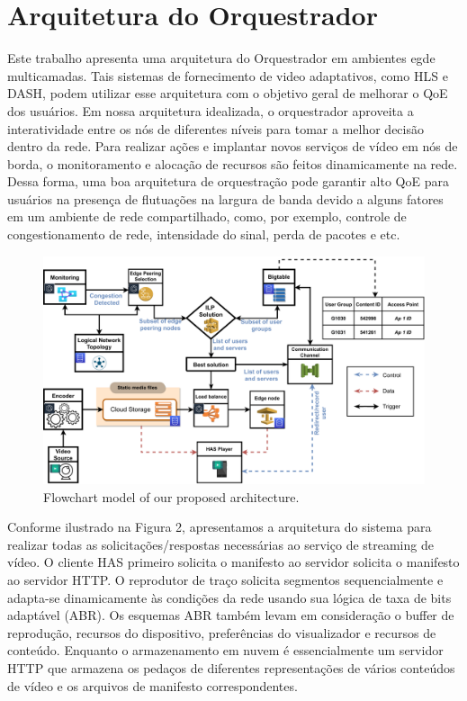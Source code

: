 \section{Arquitetura do Orquestrador}
\label{sec:mechanism}

Este trabalho apresenta uma arquitetura do Orquestrador em ambientes egde multicamadas. Tais sistemas de fornecimento de video adaptativos, como HLS e DASH, podem utilizar esse arquitetura com o objetivo geral de melhorar o QoE dos usuários.
Em nossa arquitetura idealizada, o orquestrador aproveita a interatividade entre os nós de diferentes níveis para tomar a melhor decisão dentro da rede. 
Para realizar ações e implantar novos serviços de vídeo em nós de borda, o monitoramento e alocação de recursos são feitos dinamicamente na rede. Dessa forma, uma boa arquitetura de orquestração pode garantir alto QoE para usuários na presença de flutuações na largura de banda devido a alguns fatores em um ambiente de rede compartilhado, como, por exemplo, controle de congestionamento de rede, intensidade do sinal, perda de pacotes e etc.

\begin{figure}
  \includegraphics[width=\linewidth]{images/flow-model-infrastructure.pdf}
  \caption{Flowchart model of our proposed architecture.}
\end{figure}

Conforme ilustrado na Figura 2, apresentamos a arquitetura do sistema para realizar todas as solicitações/respostas necessárias ao serviço de streaming de vídeo. O cliente HAS primeiro solicita o manifesto ao servidor solicita o manifesto ao servidor HTTP. O reprodutor de traço solicita segmentos sequencialmente e adapta-se dinamicamente às condições da rede usando sua lógica de taxa de bits adaptável (ABR). Os esquemas ABR também levam em consideração o buffer de reprodução, recursos do dispositivo, preferências do visualizador e recursos de conteúdo. Enquanto o armazenamento em nuvem é essencialmente um servidor HTTP que armazena os pedaços de diferentes representações de vários conteúdos de vídeo e os arquivos de manifesto correspondentes.%



